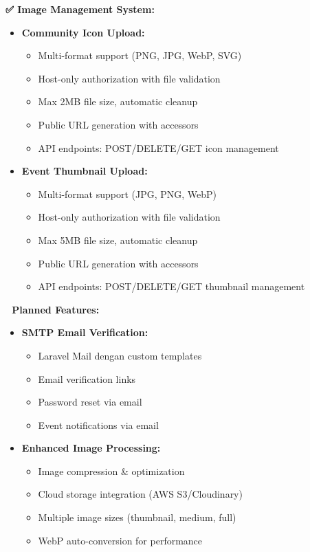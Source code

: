 \documentclass[12pt,a4paper]{article}
\begin{document}
\begin{implemented}
\textbf{✅ Image Management System:}
\begin{itemize}
    \item \textbf{Community Icon Upload:}
    \begin{itemize}
        \item Multi-format support (PNG, JPG, WebP, SVG)
        \item Host-only authorization with file validation
        \item Max 2MB file size, automatic cleanup
        \item Public URL generation with accessors
        \item API endpoints: POST/DELETE/GET icon management
    \end{itemize}
    \item \textbf{Event Thumbnail Upload:}
    \begin{itemize}
        \item Multi-format support (JPG, PNG, WebP)
        \item Host-only authorization with file validation
        \item Max 5MB file size, automatic cleanup
        \item Public URL generation with accessors
        \item API endpoints: POST/DELETE/GET thumbnail management
    \end{itemize}
\end{itemize}
\end{implemented}

\begin{planned}
\textbf{🔄 Planned Features:}
\begin{itemize}
    \item \textbf{SMTP Email Verification:}
    \begin{itemize}
        \item Laravel Mail dengan custom templates
        \item Email verification links
        \item Password reset via email
        \item Event notifications via email
    \end{itemize}
    \item \textbf{Enhanced Image Processing:}
    \begin{itemize}
        \item Image compression \& optimization
        \item Cloud storage integration (AWS S3/Cloudinary)
        \item Multiple image sizes (thumbnail, medium, full)
        \item WebP auto-conversion for performance
    \end{itemize}
\end{itemize}
\end{planned}
\end{document}
